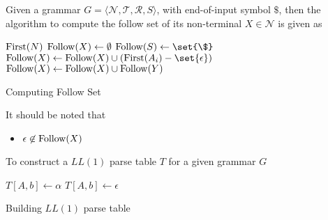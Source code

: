 \begin{definition}
    Given a grammar $G = \langle \mathcal{N}, \mathcal{T}, \mathcal{R}, S \rangle$, with end-of-input symbol $\$$, then the algorithm to compute the follow set of its non-terminal $X \in \mathcal{N}$ is given as
    \begin{algorithm}[H]
        \begin{algorithmic}[1]
                \State $\mathrm{First}{(N)}$ \gets {}
            \EndFor
            \State $\mathrm{Follow}{(X)} \gets \emptyset$
            \State $\Follow{S} \gets \set{\$}$ 
                    \State $\Follow{X} \gets \Follow{X} \cup (\First{A_i} - \set{\epsilon})$
                        \State {}
                    \EndIf
                \EndFor
                \State $\mathrm{Follow}{(X)} \gets \mathrm{Follow}{(X)} \cup \mathrm{Follow}{(Y)}$ 
            \EndFor
            \EndProcedure
        \end{algorithmic}
        \caption{Computing Follow Set}
        \label{prog:compute-follow-set}
    \end{algorithm}
    
    It should be noted that
    \begin{itemize}
        \item $\epsilon \not\in \mathrm{Follow}{(X)}$
    \end{itemize}
\end{definition}

\begin{definition}
    To construct a $LL(1)$ parse table $T$ for a given grammar $G$
    \begin{algorithm}[H]
        \begin{algorithmic}[1]
                        \State $T[A, b] \gets \alpha$
                    \EndFor
                    \If{$\alpha \to^\ast \epsilon$}
                            \State $T[A, b] \gets \epsilon$
                        \EndFor
                    \EndIf
                \EndFor
            \EndProcedure
        \end{algorithmic}
        \caption{Building $LL(1)$ parse table}
        \label{prog:build-ll(1)-parse-table}
    \end{algorithm}
\end{definition}

